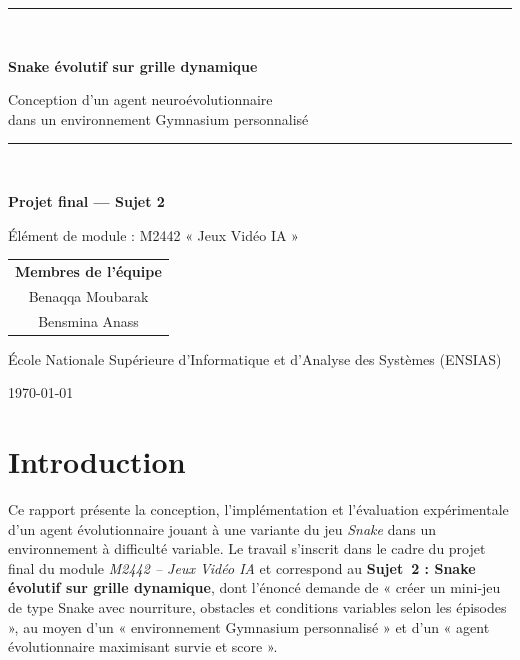 \documentclass[11pt,a4paper]{article}
\begin{document}
\begin{titlepage}
\centering
\vspace*{1.5cm}
{\color{bleu}\rule{\linewidth}{1.2pt}}\\[0.5cm]
{\Huge\bfseries\color{bleu} Snake évolutif sur grille dynamique\par}
\vspace{0.4cm}
{\Large Conception d'un agent neuroévolutionnaire\\ dans un environnement Gymnasium personnalisé\par}
\vspace{0.3cm}
{\color{bleu}\rule{\linewidth}{1.2pt}}\\[1.2cm]

{\large\textbf{Projet final --- Sujet 2}\par}
{\large Élément de module : M2442 « Jeux Vidéo IA »\par}
\vspace{1.5cm}

\begin{tabular}{c}
\Large\textbf{Membres de l'équipe}\\[0.4cm]
\large Benaqqa Moubarak\\[0.2cm]
\large Bensmina Anass\\
\end{tabular}

\vfill
{\large École Nationale Supérieure d'Informatique et d'Analyse des Systèmes (ENSIAS)\par}
\vspace{0.4cm}
{\large \today\par}
\end{titlepage}

\tableofcontents
\newpage

\section{Introduction}

Ce rapport présente la conception, l'implémentation et l'évaluation expérimentale
d'un agent évolutionnaire jouant à une variante du jeu \emph{Snake} dans un
environnement à difficulté variable. Le travail s'inscrit dans le cadre du projet
final du module \emph{M2442 -- Jeux Vidéo IA} et correspond au \textbf{Sujet~2 :
Snake évolutif sur grille dynamique}, dont l'énoncé demande de « créer un mini-jeu
de type Snake avec nourriture, obstacles et conditions variables selon les
épisodes », au moyen d'un « environnement Gymnasium personnalisé » et d'un
« agent évolutionnaire maximisant survie et score ».
\end{document}
